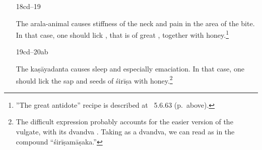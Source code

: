 \begin{translation}
\begin{itemize}
The \Gls{chuchundara} causes constipation, paralysis of the neck, and
.\footnote{ is one of the
    eighty wind diseases listed in the \emph{Kāśyapasaṃhitā} and glossed
    by Hemarājaśarman as “yawning” (Hindī ,
    ). However, in the \CS\ it is a term for one
    of the disorders of an improperly treated post-partum umbilical cord
    (glossed by Ḍalhaṇa as  “growing larger
    moment by moment,” ) and translated by
    [480]{shar-1994} as “umbilical hernia.”
    Cf.\,[756]{josi-maha}.} %
    In this case, one should administer a caustic made of
    \gls{yavanāla} and \gls{ārṣabhī} as well as the two
    \glspl{bṛhatī}.\footnote{Note that half-verses 16cd and 16ab are
        reversed compared to the vulgate edition.  This makes the caustic
        a remedy for the bite of the \Gls{chuchundara}, while the
        earlier \gls{jālinī} remedy is for the \Gls{cikkira}, which makes
        betters sense.
        
        The vulgate has text at this point, 17 and 18ab, that are not
present in the Nepalese version.  They are about further
symptoms and treatment of stiffness of the neck, anosmia,
etc., presumably arising from the bite of the
\Gls{chuchundara}.  recorded different
readings from Gayadāsa's commentary here (see edition notes);
it seems these verses became slightly confused at an early
period. We would expect symptoms of the bite of the
\Gls{arala-animal} at this point in the text, and the Great Antidote
treatment in the next line would be its therapy.}

    
\item[18cd--19]

The \Gls{arala-animal} causes stiffness of the neck and pain in the area of the bite.
In that case, one should lick , that
is of great , together with honey.\footnote{”The great
    antidote” recipe is described at \SS\ 5.6.63 (p.\,\pageref{mahāgada}
    above).}

\item[19cd--20ab]

The \Gls{kaṣāyadanta} causes sleep and especially emaciation. 
In that case, one should lick the sap and seeds of \gls{śirīṣa} with 
honey.\footnote{The difficult expression  
probably accounts for the easier version of the vulgate, with its dvandva 
.  Taking  as a dvandva, we can read 
 as in the compound  “\gls{śirīṣamāṣaka}.”}


\end{itemize}
\end{translation}
